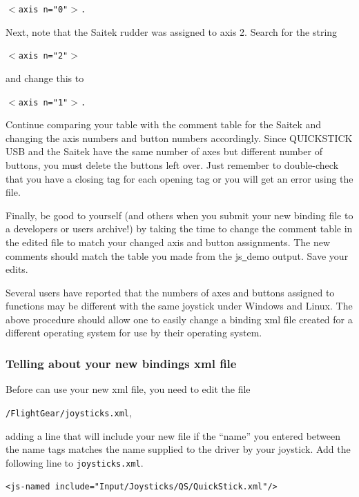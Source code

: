 	\texttt{$<$axis n="0"$>$.}
\medskip

Next, note that the Saitek rudder was assigned to axis 2.  Search for the string
\medskip

	\texttt{$<$axis n="2"$>$}

\noindent
and change this to
\medskip

	\texttt{$<$axis n="1"$>$.}
\medskip

\noindent
Continue comparing your table with the comment table for the Saitek and changing the axis numbers and button numbers accordingly.  Since QUICKSTICK USB and the Saitek have the same number of axes but different number of buttons, you must delete the buttons left over.  Just remember to double-check that you have a closing tag for each opening tag or you will get an error using the file.

Finally, be good to yourself (and others when you submit your new binding file to a \FlightGear{} developers or users archive!) by taking the time to change the comment table in the edited file to match your changed axis and button assignments.  The new comments should match the table you made from the js\underline{~}demo output.  Save your edits.

Several users have reported that the numbers of axes and buttons assigned to functions may be different with the same joystick under Windows and Linux.  The above procedure should allow one to easily change a binding xml file created for a different operating system for use by their operating system.

\subsubsection{Telling \FlightGear{} about your new bindings xml file\label{telling}}
Before \FlightGear{} can use your new xml file, you need to edit the file

\noindent
 \texttt{/FlightGear/joysticks.xml},


\noindent
adding a line that will include your new file if the ``name'' you entered between the name tags matches the name supplied to the driver by your joystick.  Add the following line to \texttt{joysticks.xml}.
\medskip

\noindent
	\texttt{<js-named include="Input/Joysticks/QS/QuickStick.xml"/>}
\medskip

